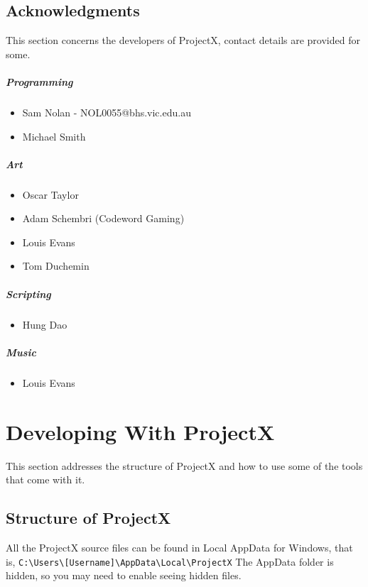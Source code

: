 \documentclass{book}
\newenvironment{ulist}
	{\begin{itemize}
			\itemsep0em}
	{\end{itemize}}
\begin{document}
	\section{Acknowledgments}
	This section concerns the developers of ProjectX, contact details are provided for some.
	
	\paragraph{Programming}
	\begin{ulist}
		\item Sam Nolan - NOL0055@bhs.vic.edu.au
		\item Michael Smith
	\end{ulist}
	
	\paragraph{Art}
	\begin{ulist}
		\item Oscar Taylor
		\item Adam Schembri (Codeword Gaming)
		\item Louis Evans
		\item Tom Duchemin
	\end{ulist}
	
	\paragraph{Scripting}
	\begin{ulist}
		\item Hung Dao
	\end{ulist}
	
	\paragraph{Music}
	\begin{ulist}
		\item Louis Evans
	\end{ulist}
	
	\chapter{Developing With ProjectX}
	This section addresses the structure of ProjectX and how to use some of the tools that come with it.
	
	\section{Structure of ProjectX}
	All the ProjectX source files can be found in Local AppData for Windows, that is, \texttt{C:\textbackslash Users\textbackslash [Username]\textbackslash AppData\textbackslash Local\textbackslash ProjectX} The AppData folder is hidden, so you may need to enable seeing hidden files.
	
\end{document}
